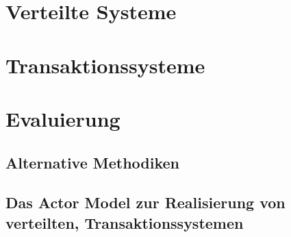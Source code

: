 
\chapter{Verteilte Systeme}
\chapter{Transaktionssysteme}
\chapter{Evaluierung}
\section{Alternative Methodiken}
\section{Das Actor Model zur Realisierung von verteilten, Transaktionssystemen} 
\section{}